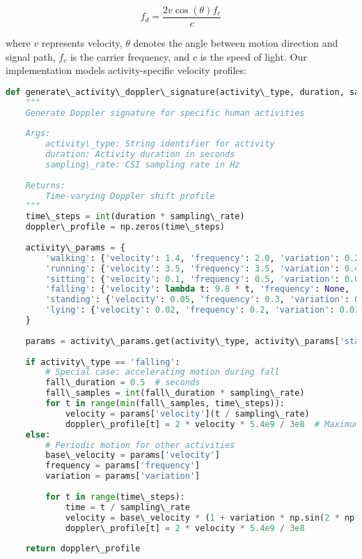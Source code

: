 \documentclass[journal]{IEEEtran}
\begin{document}
\begin{equation}
f_d = \frac{2v \cos(\theta)f_c}{c}
\end{equation}

where $v$ represents velocity, $\theta$ denotes the angle between motion direction and signal path, $f_c$ is the carrier frequency, and $c$ is the speed of light. Our implementation models activity-specific velocity profiles:

\begin{lstlisting}[language=Python, caption=Activity-Specific Doppler Modeling]
def generate\_activity\_doppler\_signature(activity\_type, duration, sampling\_rate=1000):
    """
    Generate Doppler signature for specific human activities
    
    Args:
        activity\_type: String identifier for activity
        duration: Activity duration in seconds
        sampling\_rate: CSI sampling rate in Hz
    
    Returns:
        Time-varying Doppler shift profile
    """
    time\_steps = int(duration * sampling\_rate)
    doppler\_profile = np.zeros(time\_steps)
    
    activity\_params = {
        'walking': {'velocity': 1.4, 'frequency': 2.0, 'variation': 0.2},
        'running': {'velocity': 3.5, 'frequency': 3.5, 'variation': 0.4},
        'sitting': {'velocity': 0.1, 'frequency': 0.5, 'variation': 0.05},
        'falling': {'velocity': lambda t: 9.8 * t, 'frequency': None, 'variation': 0.1},
        'standing': {'velocity': 0.05, 'frequency': 0.3, 'variation': 0.02},
        'lying': {'velocity': 0.02, 'frequency': 0.2, 'variation': 0.01}
    }
    
    params = activity\_params.get(activity\_type, activity\_params['standing'])
    
    if activity\_type == 'falling':
        # Special case: accelerating motion during fall
        fall\_duration = 0.5  # seconds
        fall\_samples = int(fall\_duration * sampling\_rate)
        for t in range(min(fall\_samples, time\_steps)):
            velocity = params['velocity'](t / sampling\_rate)
            doppler\_profile[t] = 2 * velocity * 5.4e9 / 3e8  # Maximum Doppler shift
    else:
        # Periodic motion for other activities
        base\_velocity = params['velocity']
        frequency = params['frequency']
        variation = params['variation']
        
        for t in range(time\_steps):
            time = t / sampling\_rate
            velocity = base\_velocity * (1 + variation * np.sin(2 * np.pi * frequency * time))
            doppler\_profile[t] = 2 * velocity * 5.4e9 / 3e8
    
    return doppler\_profile
\end{lstlisting}
\end{document}
